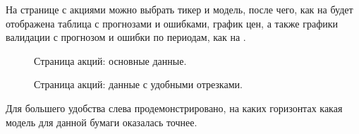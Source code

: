 \documentclass[12pt, a4paper]{article}
\begin{document}
На странице с акциями можно выбрать тикер и модель, после чего, как на  будет отображена таблица с прогнозами и ошибками, график цен, а также графики валидации с прогнозом и ошибки по периодам, как на .
\begin{figure}[!h]
\caption{Страница акций: основные данные.}
\label{fig:stocks}
\end{figure}
\begin{figure}[!h]
\caption{Страница акций: данные с удобными отрезками.}
\label{fig:stocks_other}
\end{figure}

Для большего удобства слева продемонстрировано, на каких горизонтах какая модель для данной бумаги оказалась точнее.
\end{document}
